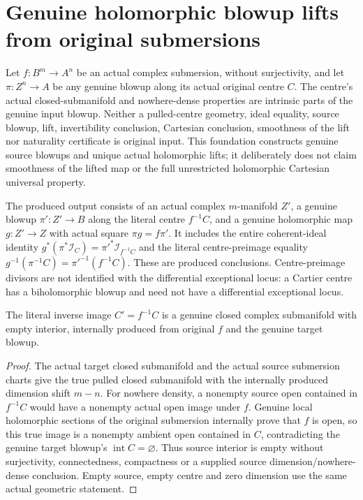 \section{Genuine holomorphic blowup lifts from original submersions}
Let $f:B^m\to A^n$ be an actual complex submersion, without surjectivity, and let $\pi:Z^n\to A$ be any genuine blowup along its actual original centre $C$. The centre's actual closed-submanifold and nowhere-dense properties are intrinsic parts of the genuine input blowup. Neither a pulled-centre geometry, ideal equality, source blowup, lift, invertibility conclusion, Cartesian conclusion, smoothness of the lift nor naturality certificate is original input. This foundation constructs genuine source blowups and unique actual holomorphic lifts; it deliberately does not claim smoothness of the lifted map or the full unrestricted holomorphic Cartesian universal property.

\begin{definition}
\label{hir:submersion-blowup-lift-output}
\leanok
{}
\uses{}
The produced output consists of an actual complex $m$-manifold $Z'$, a genuine blowup $\pi':Z'\to B$ along the literal centre $f^{-1}C$, and a genuine holomorphic map $g:Z'\to Z$ with actual square $\pi g=f\pi'$. It includes the entire coherent-ideal identity
$g^*(\pi^*\mathcal I_C)=\pi'^*\mathcal I_{f^{-1}C}$ and the literal centre-preimage equality
$g^{-1}(\pi^{-1}C)=\pi'^{-1}(f^{-1}C)$. These are produced conclusions. Centre-preimage divisors are not identified with the differential exceptional locus: a Cartier centre has a biholomorphic blowup and need not have a differential exceptional locus.
\end{definition}

\begin{theorem}
\label{hir:submersion-blowup-lift-centre}
\leanok
{}
The literal inverse image $C'=f^{-1}C$ is a genuine closed complex submanifold with empty interior, internally produced from original $f$ and the genuine target blowup.
\end{theorem}
\begin{proof}
The actual target closed submanifold and the actual source submersion charts give the true pulled closed submanifold with the internally produced dimension shift $m-n$. For nowhere density, a nonempty source open contained in $f^{-1}C$ would have a nonempty actual open image under $f$. Genuine local holomorphic sections of the original submersion internally prove that $f$ is open, so this true image is a nonempty ambient open contained in $C$, contradicting the genuine target blowup's $\operatorname{int}C=\varnothing$. Thus source interior is empty without surjectivity, connectedness, compactness or a supplied source dimension/nowhere-dense conclusion. Empty source, empty centre and zero dimension use the same actual geometric statement.
\end{proof}

